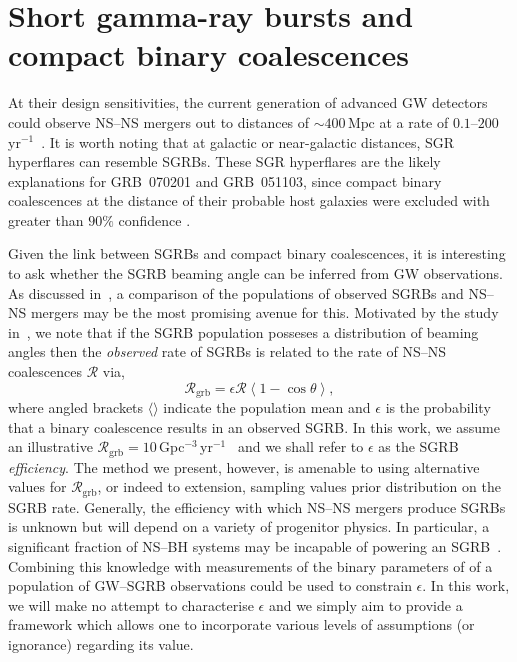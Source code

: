 \documentclass[twocolumn,nofootinbib]{revtex4-1}
\newcommand{\grbrate}{{{\mathcal R}_{\mathrm{grb}}}}
\newcommand{\cbcrate}{{{\mathcal R}}}
\newcommand{\mpc}{\mathrm{Mpc}}
\newcommand{\BNS}{\ac{NS}--\ac{NS}\xspace}
\newcommand{\NSBH}{\ac{NS}--\ac{BH}\xspace}
\newcommand{\JOINT}{\ac{GW}--\ac{SGRB}\xspace}
\begin{document}
\section{Short gamma-ray bursts and compact binary coalescences}
\label{sec:sgrbs}
At their design sensitivities, the current generation of advanced
\ac{GW} detectors could observe \BNS mergers out to distances of
${\sim}400\,\mpc$ at a rate of $0.1\text{--}200\,$yr$^{-1}$~\cite{Aasi:2013wya}.
It is worth noting that at galactic or near-galactic distances, \ac{SGR}
hyperflares can resemble \acp{SGRB}. These \ac{SGR} hyperflares are the likely
explanations for GRB~070201 and GRB~051103, since compact binary coalescences at
the distance of their probable host galaxies were excluded with
greater than $90\%$ confidence \cite{Abbott:2007rh,Abadie:2012bz}.

Given the link between \acp{SGRB} and compact binary coalescences, it is
interesting to ask whether the \ac{SGRB} beaming angle can be inferred from
\ac{GW} observations. As discussed in~\cite{Clark:2014jpa}, a comparison of
the populations of observed \acp{SGRB} and \BNS mergers may be the most
promising avenue for this. Motivated by the study in~\cite{Chen:2012qh},
we note that if the \ac{SGRB} population posseses a distribution of beaming
angles then the \emph{observed} rate of \acp{SGRB} is related to the rate of
\BNS coalescences $\cbcrate$ via,
%
\begin{equation}\label{eq:rate2angle}
    \grbrate = \epsilon\cbcrate \left \langle 1-\cos \theta \right \rangle,
\end{equation}
%
where angled brackets $\langle \rangle$ indicate the population mean
and $\epsilon$ is the probability that a binary coalescence results in
an observed \ac{SGRB}.  In this work, we assume an illustrative
$\grbrate=10$\,Gpc$^{-3}$\,yr$^{-1}$~\cite{Nakar:2007yr,Dietz:2010eh}
and we shall refer to $\epsilon$ as the \ac{SGRB}
\emph{efficiency}. The method we present, however, is amenable to
using alternative values for $\grbrate$, or indeed to extension,
sampling values prior distribution on the \ac{SGRB} rate.  Generally,
the efficiency with which \BNS mergers produce \acp{SGRB} is unknown
but will depend on a variety of progenitor physics.  In particular, a
significant fraction of \NSBH systems may be incapable of powering an
\ac{SGRB}~\cite{Pannarale:2014rea}.  Combining this knowledge with
measurements of the binary parameters of of a population of \JOINT
observations could be used to constrain $\epsilon$.  In this work, we
will make no attempt to characterise $\epsilon$ and we simply aim to
provide a framework which allows one to incorporate various levels of
assumptions (or ignorance) regarding its value.
\end{document}
